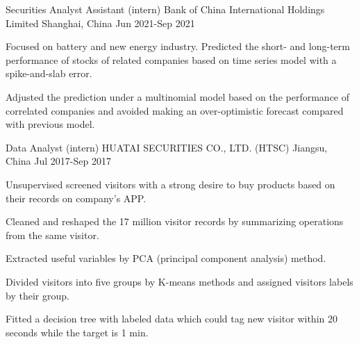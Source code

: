 \begin{cventries}
    


  \cventry
    {Securities Analyst Assistant (intern)} %
    {Bank of China International Holdings Limited} %
    {Shanghai, China} %
    {Jun 2021-Sep 2021} %
    {
      \begin{cvitems} %
        \item {Focused on battery and new energy industry. Predicted the short- and long-term performance of stocks of related companies based on time series model with a spike-and-slab error.}
        \item {Adjusted the prediction under a multinomial model based on the performance of correlated companies and avoided making an over-optimistic forecast compared with previous model.}
      \end{cvitems}
    }

  \cventry
    {Data Analyst (intern)} %
    {HUATAI SECURITIES CO., LTD. (HTSC)} %
    {Jiangsu, China} %
    {Jul 2017-Sep 2017} %
    {
      \begin{cvitems} %
        \item {Unsupervised screened visitors with a strong desire to buy products based on their records on company’s APP.}
        \item {Cleaned and reshaped the 17 million visitor records by summarizing operations from the same visitor.}
        \item {Extracted useful variables by PCA (principal component analysis) method.}
        \item {Divided visitors into five groups by K-means methods and assigned visitors labels by their group.}
        \item {Fitted a decision tree with labeled data which could tag new visitor within 20 seconds while the target is 1 min.}
      \end{cvitems}
    }



\end{cventries}
